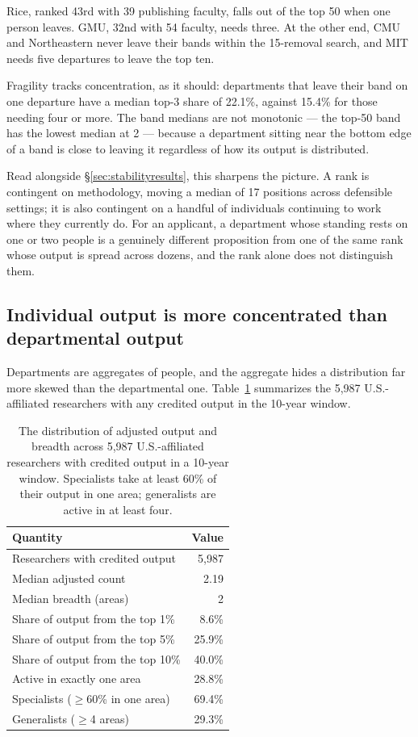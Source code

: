 \documentclass[11pt]{article}
\begin{document}
Rice, ranked 43rd with 39 publishing faculty, falls out of the top 50 when one
person leaves. GMU, 32nd with 54 faculty, needs three. At the other end,
CMU and Northeastern never leave their bands within the 15-removal
search, and MIT needs five departures to leave the top ten.

Fragility tracks concentration, as it should: departments that leave their band
on one departure have a median top-3 share of 22.1\%, against 15.4\% for those
needing four or more. The band medians are not monotonic --- the top-50 band has
the lowest median at 2 --- because a department sitting near the bottom edge of
a band is close to leaving it regardless of how its output is distributed.

Read alongside \S\ref{sec:stabilityresults}, this sharpens the picture. A rank
is contingent on methodology, moving a median of 17 positions across defensible
settings; it is also contingent on a handful of individuals continuing to work
where they currently do. For an applicant, a department whose standing rests on
one or two people is a genuinely different proposition from one of the same rank
whose output is spread across dozens, and the rank alone does not distinguish
them.

\subsection{Individual output is more concentrated than departmental output}
\label{sec:researchers}

Departments are aggregates of people, and the aggregate hides a distribution
far more skewed than the departmental one. Table~\ref{tab:researcherdist}
summarizes the 5{,}987 U.S.-affiliated researchers with any credited output in
the 10-year window.

\begin{table}[t]
\centering
\caption{The distribution of adjusted output and breadth across 5{,}987
U.S.-affiliated researchers with credited output in a 10-year window.
Specialists take at least 60\% of their output in one area; generalists are
active in at least four.}
\label{tab:researcherdist}
\begin{tabular}{lr}
\toprule
Quantity & Value \\
\midrule
Researchers with credited output    & 5{,}987 \\
Median adjusted count               & 2.19 \\
Median breadth (areas)              & 2 \\
\midrule
Share of output from the top 1\%    & 8.6\% \\
Share of output from the top 5\%    & 25.9\% \\
Share of output from the top 10\%   & 40.0\% \\
\midrule
Active in exactly one area          & 28.8\% \\
Specialists ($\ge$60\% in one area) & 69.4\% \\
Generalists ($\ge$4 areas)          & 29.3\% \\
\bottomrule
\end{tabular}
\end{table}
\end{document}
